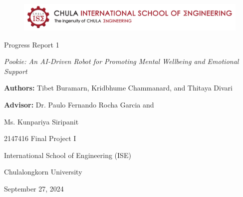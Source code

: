 \documentclass[a4paper,10pt]{article}
\begin{document}
\begin{titlepage}
    \centering  
    \begin{figure}[ht]
        \centering
        \includegraphics[width=\textwidth]{ise-logo.png}
    \end{figure}
    \vspace*{2cm} 
    
    {\Huge Progress Report 1\par}
    \vspace{1cm}
    
    {\Huge \textit{Pookie: An AI-Driven Robot for Promoting Mental Wellbeing and Emotional Support} \par}
    \vspace{3cm}
    
    {\large \textbf{Authors:} Tibet Buramarn, Kridbhume Chammanard, and Thitaya Divari \par}
    \vspace{1cm}
    {\large \textbf{Advisor:} Dr. Paulo Fernando Rocha Garcia and \par}
    {\large Ms. Kunpariya Siripanit \par}

    \vspace{3cm}
    
    {\large 2147416 Final Project I \par}
    {\large International School of Engineering (ISE) \par}
    {\large Chulalongkorn University \par}
    
    \vspace{2cm}
    
    {\large September 27, 2024 \par}
    
    \vspace*{\fill}
\end{titlepage}

\thispagestyle{empty}

\newpage
\tableofcontents

\newpage


\newpage

\newpage

\newpage


\newpage
{}


\end{document}
